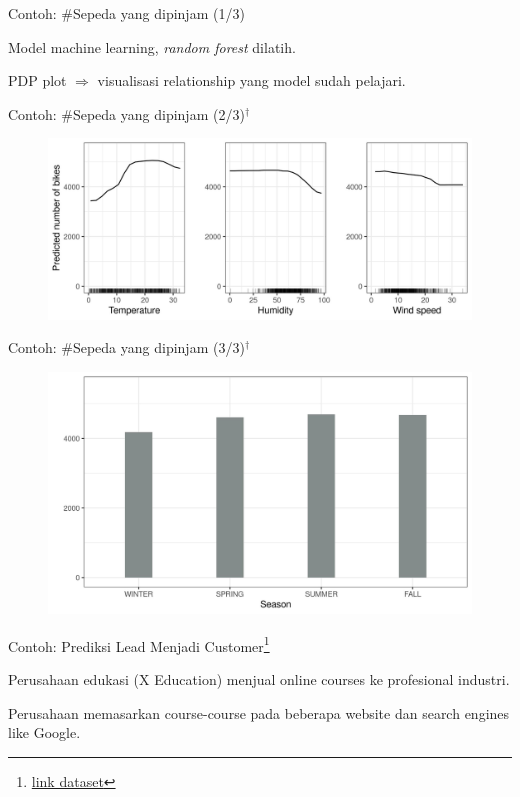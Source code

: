 \documentclass[aspectratio=169]{beamer}
\begin{document}
\begin{frame}{Contoh: \#Sepeda yang dipinjam (1/3)}
	\begin{vfilleditems}
		\item Model machine learning, \textit{random forest} dilatih.
		\item PDP plot $\Rightarrow$ visualisasi relationship yang model sudah pelajari.
	\end{vfilleditems}
\end{frame}

\begin{frame}{Contoh: \#Sepeda yang dipinjam (2/3)$^\dagger$}
	\begin{figure}[!ht]
		\centering
		\includegraphics[scale=.75]{images/pdp-bike-1}
	\end{figure}
\end{frame}

\begin{frame}{Contoh: \#Sepeda yang dipinjam (3/3)$^\dagger$}
	\begin{figure}[!ht]
		\centering
		\includegraphics[scale=.6]{images/pdp-bike-cat-1}
	\end{figure}
\end{frame}

\begin{frame}{Contoh: Prediksi Lead Menjadi Customer\footnote{\href{https://www.kaggle.com/datasets/lakshmikalyan/lead-scoring-x-online-education}{link dataset} }}
	\begin{vfilleditems}
		\item Perusahaan edukasi (X Education) menjual online courses ke profesional industri.
		\item Perusahaan memasarkan course-course pada beberapa website dan search engines like Google.
	\end{vfilleditems}
\end{frame}
\end{document}
